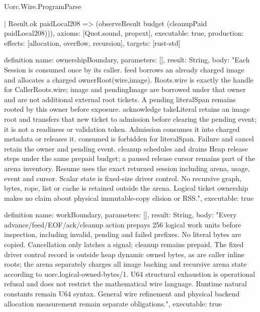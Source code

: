 \begin{lexlean}{Uorc.Wire.ProgramParse}
\begin{semanticmodule}
{    | Result.ok paidLocal208 => (observeResult budget (cleanupPaid paidLocal208))),
  axioms: [Quot.sound, propext],
  executable: true,
  production: {effects: [allocation, overflow, recursion], targets: [rust-std]}
}

definition{
  name: ownershipBoundary,
  parameters: [],
  result: String,
  body: "Each Session is consumed once by its caller. feed borrows an already charged image and allocates a charged ownerRoot(wire,image). Roots.wire is exactly the handle for CallerRoots.wire; image and pendingImage are borrowed under that owner and are not additional external root tickets. A pending literalSpan remains rooted by this owner before exposure. acknowledge takeLiteral retains an image root and transfers that new ticket to admission before clearing the pending event; it is not a readiness or validation token. Admission consumes it into charged metadata or releases it. consumed is forbidden for literalSpan. Failure and cancel retain the owner and pending event. cleanup schedules and drains Heap release steps under the same prepaid budget; a paused release cursor remains part of the arena inventory. Resume uses the exact returned session including arena, usage, event and cursor. Scalar state is fixed-size driver control. No recursive graph, bytes, rope, list or cache is retained outside the arena. Logical ticket ownership makes no claim about physical immutable-copy elision or RSS.",
  executable: true
}

definition{
  name: workBoundary,
  parameters: [],
  result: String,
  body: "Every advance/feed/EOF/ack/cleanup action prepays 256 logical work units before inspection, including invalid, pending and failed prefixes. No literal bytes are copied. Cancellation only latches a signal; cleanup remains prepaid. The fixed driver control record is outside heap dynamic owned bytes, as are caller inline roots; the arena separately charges all image backing and recursive arena state according to uorc.logical-owned-bytes/1. U64 structural exhaustion is operational refusal and does not restrict the mathematical wire language. Runtime natural constants remain U64 syntax. General wire refinement and physical backend allocation measurement remain separate obligations.",
  executable: true
}


\end{semanticmodule}
\end{lexlean}
